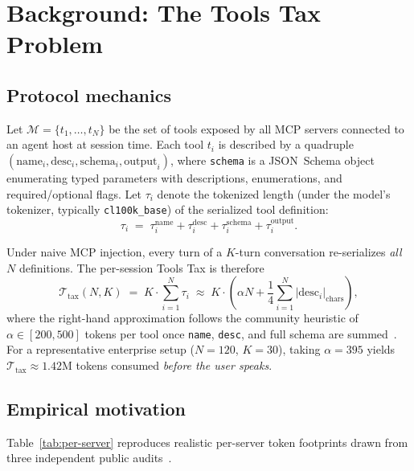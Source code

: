 \documentclass[11pt]{article}
\newcommand{\ToolsTax}{\mathcal{T}_{\text{tax}}}
\begin{document}
\section{Background: The Tools Tax Problem}\label{sec:background}

\subsection{Protocol mechanics}

Let $\mathcal{M} = \{t_1, \dots, t_N\}$ be the set of tools exposed by all MCP servers connected to an agent host at session time. Each tool $t_i$ is described by a quadruple $(\text{name}_i, \text{desc}_i, \text{schema}_i, \text{output}_i)$, where \texttt{schema} is a JSON~Schema object enumerating typed parameters with descriptions, enumerations, and required/optional flags. Let $\tau_i$ denote the tokenized length (under the model's tokenizer, typically \texttt{cl100k\_base}) of the serialized tool definition:
\begin{equation}
\tau_i \;=\; \tau_i^{\text{name}} + \tau_i^{\text{desc}} + \tau_i^{\text{schema}} + \tau_i^{\text{output}}.
\end{equation}

Under naive MCP injection, every turn of a $K$-turn conversation re-serializes \emph{all} $N$ definitions. The per-session Tools Tax is therefore
\begin{equation}
\ToolsTax(N,K) \;=\; K \cdot \sum_{i=1}^{N} \tau_i \;\approx\; K \cdot \!\left( \alpha N + \frac{1}{4} \sum_{i=1}^{N} \lvert \text{desc}_i \rvert_{\text{chars}} \right),
\label{eq:toolstax}
\end{equation}
where the right-hand approximation follows the community heuristic of $\alpha \in [200, 500]$ tokens per tool once \texttt{name}, \texttt{desc}, and full schema are summed~\citep{pan2026agent,mindstudio2026claudecode}. For a representative enterprise setup ($N=120$, $K=30$), taking $\alpha=395$ yields $\ToolsTax \approx 1.42\text{M}$ tokens consumed \emph{before the user speaks}.

\subsection{Empirical motivation}

Table~\ref{tab:per-server} reproduces realistic per-server token footprints drawn from three independent public audits~\citep{pan2026agent,mindstudio2026claudecode,saha2026agentic}.
\end{document}
